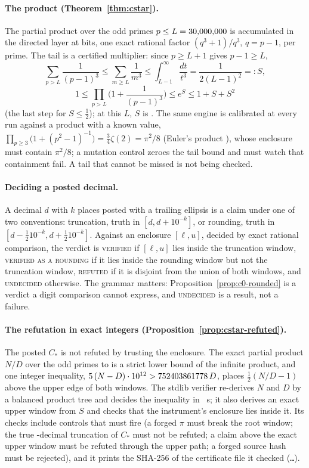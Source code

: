 \documentclass[11pt]{article}
\theoremstyle{definition}\newtheorem{observation}{Observation}
\newcommand{\Cstar}{C_{*}}
\begin{document}
\paragraph{The product (Theorem~\ref{thm:cstar}).} The partial product over the odd primes $p\le L=30{,}000{,}000$ is accumulated in the directed layer at \CstarBits{} bits, one exact rational factor $(q^3+1)/q^3$, $q=p-1$, per prime. The tail is a certified multiplier: since $p\ge L+1$ gives $p-1\ge L$,
\[
\sum_{p>L}\frac{1}{(p-1)^3}\le\sum_{m\ge L}\frac1{m^3}\le\int_{L-1}^\infty\frac{dt}{t^3}=\frac{1}{2(L-1)^2}=:S,
\]
\[
1\le\prod_{p>L}\Big(1+\frac1{(p-1)^3}\Big)\le e^S\le1+S+S^2
\]
(the last step for $S\le\tfrac12$); at this $L$, $S$ is \CstarTail. The same engine is calibrated at every run against a product with a known value, $\prod_{p\ge3}\big(1+(p^2-1)^{-1}\big)=\tfrac34\zeta(2)=\pi^2/8$ (Euler's product \cite{HardyWright}), whose enclosure must contain $\pi^2/8$; a mutation control zeroes the tail bound and must watch that containment fail. A tail that cannot be missed is not being checked.

\paragraph{Deciding a posted decimal.} A decimal $d$ with $k$ places posted with a trailing ellipsis is a claim under one of two conventions: truncation, truth in $[d,d+10^{-k}]$, or rounding, truth in $[d-\tfrac12 10^{-k},d+\tfrac12 10^{-k}]$. Against an enclosure $[\ell,u]$, decided by exact rational comparison, the verdict is \textsc{verified} if $[\ell,u]$ lies inside the truncation window, \textsc{verified as a rounding} if it lies inside the rounding window but not the truncation window, \textsc{refuted} if it is disjoint from the union of both windows, and \textsc{undecided} otherwise. The grammar matters: Proposition~\ref{prop:c0-rounded} is a verdict a digit comparison cannot express, and \textsc{undecided} is a result, not a failure.

\paragraph{The refutation in exact integers (Proposition~\ref{prop:cstar-refuted}).} The posted $\Cstar$ is not refuted by trusting the enclosure. The exact partial product $N/D$ over the odd primes to \RefLimit{} is a strict lower bound of the infinite product, and one integer inequality, $5\,(N-D)\cdot 10^{12} > 752403861778\,D$, places $\tfrac12(N/D-1)$ above the upper edge of both windows. The stdlib verifier re-derives $N$ and $D$ by a balanced product tree and decides the inequality in \VerifierSeconds{}~s; it also derives an exact upper window from $S$ and checks that the instrument's enclosure lies inside it. Its \VerifierChecks{} checks include \VerifierReds{} controls that must fire (a forged $\pi$ must break the root window; the true \CstarPubDecimals-decimal truncation of $\Cstar$ must not be refuted; a claim above the exact upper window must be refuted through the upper path; a forged source hash must be rejected), and it prints the SHA-256 of the certificate file it checked (\texttt{\CertSha\ldots}).
\end{document}
